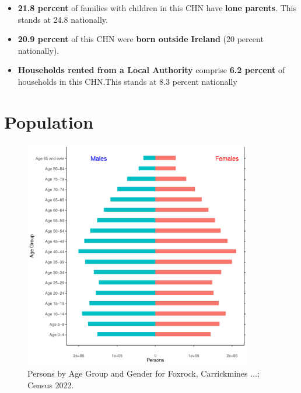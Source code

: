 \documentclass{article}
\begin{document}
\begin{itemize}
\item \textbf{21.8 percent} of families with children in this CHN have \textbf{lone parents}. This stands at 24.8 nationally.

\item \textbf{20.9 percent} of this CHN were \textbf{born outside Ireland} (20 percent nationally).

\item \textbf{Households rented from a Local Authority} comprise \textbf{6.2 percent} of households in this CHN.This stands at 8.3 percent nationally

\end{itemize}

\pagebreak

\section{Population} 
\label{sect:Pop}

\begin{figure}[h]
	\centering
	\includegraphics[width = 100mm]{../figures/PyramidPlot.pdf}
	\caption{Persons by Age Group and Gender for Foxrock, Carrickmines ...; Census 2022.}
	\label{fig:2ae19629-1a6a-13a3-e055-000000000001}
	\end{figure}
\end{document}
